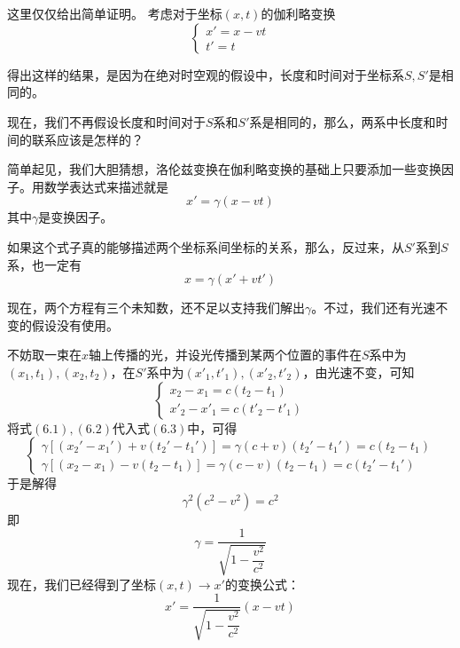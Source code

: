 \chapter[狭义相对论]{}
\begin{prove}
    这里仅仅给出简单证明。
    考虑对于坐标$(x,t)$的伽利略变换
    \[\left\{
        \begin{array}{l}
            x'=x-vt \\
            t'=t
        \end{array}
        \right.\]

    得出这样的结果，是因为在绝对时空观的假设中，长度和时间对于坐标系$S,S'$是相同的。

    现在，我们不再假设长度和时间对于$S$系和$S'$系是相同的，那么，两系中长度和时间的联系应该是怎样的？

    简单起见，我们大胆猜想，洛伦兹变换在伽利略变换的基础上只要添加一些变换因子。用数学表达式来描述就是
    \begin{equation}
        x'=\gamma(x-vt)
    \end{equation}
    其中$\gamma$是变换因子。

    如果这个式子真的能够描述两个坐标系间坐标的关系，那么，反过来，从$S'$系到$S$系，也一定有
    \begin{equation}
        x=\gamma(x'+vt')
    \end{equation}

    现在，两个方程有三个未知数，还不足以支持我们解出$\gamma$。不过，我们还有光速不变的假设没有使用。

    不妨取一束在$x$轴上传播的光，并设光传播到某两个位置的事件在$S$系中为$(x_1,t_1),(x_2,t_2)$，在$S'$系中为$(x'_1,t'_1),(x'_2,t'_2)$，由光速不变，可知
    \begin{equation}
        \left\{
        \begin{array}{l}
            x_2-x_1=c(t_2-t_1) \\
            x'_2-x'_1=c(t'_2-t'_1)
        \end{array}
        \right.
    \end{equation}
    将式$(6.1),(6.2)$代入式$(6.3)$中，可得
    \begin{equation}
        \left\{
        \begin{array}{l}
            \gamma[(x_2'-x_1')+v(t_2'-t_1')]=\gamma(c+v)(t_2'-t_1')=c(t_2-t_1) \\
            \gamma[(x_2-x_1)-v(t_2-t_1)]=\gamma(c-v)(t_2-t_1)=c(t_2'-t_1')
        \end{array}
        \right.
    \end{equation}
    于是解得
    \[\gamma^2(c^2-v^2)=c^2\]
    即
    \begin{equation}
        \gamma = \dfrac{1}{\sqrt{1-\dfrac{v^2}{c^2}}}
    \end{equation}
    现在，我们已经得到了坐标$(x,t)\rightarrow x'$的变换公式：
    \begin{equation}
        x'=\dfrac{1}{\sqrt{1-\dfrac{v^2}{c^2}}}(x-vt)
    \end{equation}


\end{prove}
